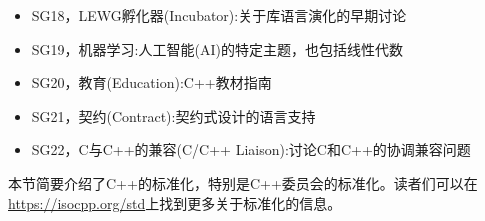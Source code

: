 \begin{itemize}
\item 
SG18，LEWG孵化器(Incubator):关于库语言演化的早期讨论

\item 
SG19，机器学习:人工智能(AI)的特定主题，也包括线性代数

\item 
SG20，教育(Education):C++教材指南

\item 
SG21，契约(Contract):契约式设计的语言支持

\item 
SG22，C与C++的兼容(C/C++ Liaison):讨论C和C++的协调兼容问题
\end{itemize}

本节简要介绍了C++的标准化，特别是C++委员会的标准化。读者们可以在\url{https://isocpp.org/std}上找到更多关于标准化的信息。












